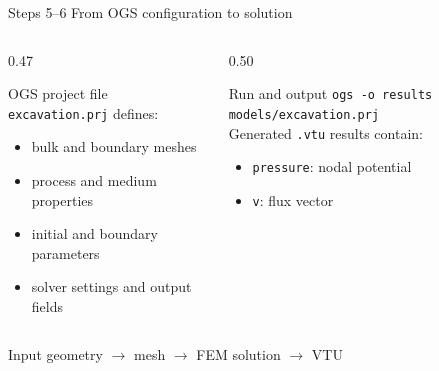 \documentclass[aspectratio=169,10pt]{beamer}
\begin{document}
\begin{frame}{Steps 5--6 \quad From OGS configuration to solution}
\begin{columns}[T,onlytextwidth]
\begin{column}{0.47\textwidth}
\begin{block}{OGS project file}\small
\texttt{excavation.prj} defines:
\begin{itemize}\item bulk and boundary meshes
\item process and medium properties
\item initial and boundary parameters
\item solver settings and output fields\end{itemize}
\end{block}
\end{column}
\begin{column}{0.50\textwidth}
\begin{block}{Run and output}\small
\texttt{ogs -o results models/excavation.prj}\\[0.2cm]
Generated \texttt{.vtu} results contain:
\begin{itemize}\item \texttt{pressure}: nodal potential\item \texttt{v}: flux vector\end{itemize}
\end{block}
\end{column}
\end{columns}
\vspace{0.2cm}
\begin{center}\Large\color{tecblue}Input geometry $\longrightarrow$ mesh $\longrightarrow$ FEM solution $\longrightarrow$ VTU\end{center}
\end{frame}
\end{document}
